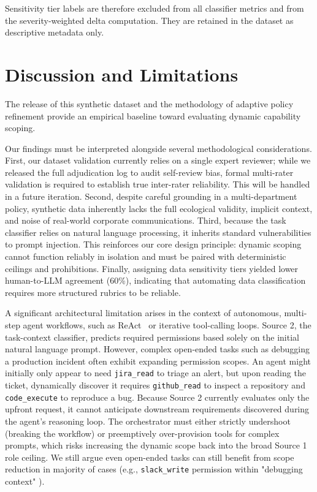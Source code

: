 \documentclass{article}
\theoremstyle{plain}
\theoremstyle{definition}
\theoremstyle{remark}
\begin{document}
Sensitivity tier labels are therefore excluded from all classifier metrics and from the severity-weighted delta computation. They are retained in the dataset as descriptive metadata only.

\section{Discussion and Limitations}
\label{sec:discussions}
The release of this synthetic dataset and the methodology of adaptive policy refinement provide an empirical baseline toward evaluating dynamic capability scoping.

Our findings must be interpreted alongside several methodological considerations. First, our dataset validation currently relies on a single expert reviewer; while we released the full adjudication log to audit self-review bias, formal multi-rater validation is required to establish true inter-rater reliability. This will be handled in a future iteration. Second, despite careful grounding in a multi-department policy, synthetic data inherently lacks the full ecological validity, implicit context, and noise of real-world corporate communications. Third, because the task classifier relies on natural language processing, it inherits standard vulnerabilities to prompt injection. This reinforces our core design principle: dynamic scoping cannot function reliably in isolation and must be paired with deterministic ceilings and prohibitions. Finally, assigning data sensitivity tiers yielded lower human-to-LLM agreement (60\%), indicating that automating data classification requires more structured rubrics to be reliable.

A significant architectural limitation arises in the context of autonomous, multi-step agent workflows, such as ReAct~\citep{yaoetal2022react} or iterative tool-calling loops. Source 2, the task-context classifier, predicts required permissions based solely on the initial natural language prompt. However, complex open-ended tasks such as debugging a production incident often exhibit expanding permission scopes. An agent might initially only appear to need \texttt{jira\_read} to triage an alert, but upon reading the ticket, dynamically discover it requires \texttt{github\_read} to inspect a repository and \texttt{code\_execute} to reproduce a bug. Because Source 2 currently evaluates only the upfront request, it cannot anticipate downstream requirements discovered during the agent's reasoning loop. The orchestrator must either strictly undershoot (breaking the workflow) or preemptively over-provision tools for complex prompts, which risks increasing the dynamic scope back into the broad Source 1 role ceiling. We still argue even open-ended tasks can still benefit from scope reduction in majority of cases (e.g., \texttt{slack\_write} permission within "debugging context" ).
\end{document}
